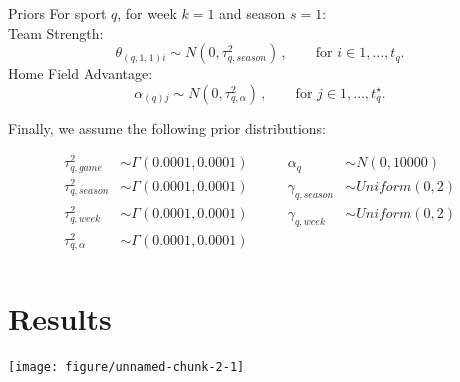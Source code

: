 \documentclass{beamer}\usepackage[]{graphicx}\usepackage[]{color}
\newenvironment{knitrout}{}{} %
\begin{document}
\begin{frame}{Priors}
For sport $q$, for week $k=1$ and season $s=1$:\\
Team Strength:\\
$$
\theta_{(q,1,1)i} \sim N(0, \tau^{2}_{q,season}) \,, \qquad \text{for } i \in 1, \ldots, t_{q}.
$$
Home Field Advantage:\\
$$
\alpha_{(q)j}\sim N(0, \tau^{2}_{q,\alpha}) \,, \qquad \text{for } j \in 1, \ldots, t^{\star}_{q}.
$$

Finally, we assume the following prior distributions: 

\begin{align*}
\tau^{2}_{q,game} &\sim \Gamma(0.0001,0.0001) &\qquad
  \alpha_{q} &\sim N(0,10000) \\
\tau^{2}_{q,season} &\sim \Gamma(0.0001,0.0001) &\qquad
  \gamma_{q,season} &\sim Uniform(0,2) \\
\tau^{2}_{q,week} &\sim \Gamma(0.0001,0.0001) &\qquad
  \gamma_{q,week} &\sim Uniform(0,2) \\
\tau^{2}_{q,\alpha} &\sim \Gamma(0.0001,0.0001) && \\
\end{align*}

\end{frame}


\section{Results}
\begin{frame}[fragile]
\begin{knitrout}
\color{fgcolor}
\texttt{[image: figure/unnamed-chunk-2-1]} 

\end{knitrout}
\end{frame}
\end{document}
